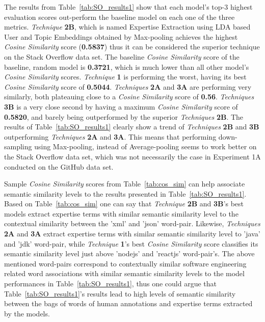         The results from Table~\ref{tab:SO_results1} show that each model's top-$3$ highest evaluation scores out-perform the baseline model on each one of the three metrics. \emph{Technique} \textbf{2B}, which is named Expertise Extraction using LDA based User and Topic Embeddings obtained by Max-pooling achieves the highest \emph{Cosine Similarity} score (\textbf{0.5837}) thus it can be considered the superior technique on the Stack Overflow data set. The baseline \emph{Cosine Similarity} score of the baseline, random model is \textbf{0.3721}, which is much lower than all other model's \emph{Cosine Similarity} scores. \emph{Technique} \textbf{1} is performing the worst, having its best \emph{Cosine Similarity} score of \textbf{0.5044}. \emph{Techniques} \textbf{2A} and \textbf{3A} are performing very similarly, both plateauing close to a \emph{Cosine Similarity} score of \textbf{0.56}. \emph{Techniques} \textbf{3B} is a very close second by having a maximum \emph{Cosine Similarity} score of \textbf{0.5820}, and barely being outperformed by the superior \emph{Techniques} \textbf{2B}. The results of Table~\ref{tab:SO_results1} clearly show a trend of \emph{Techniques} \textbf{2B} and \textbf{3B} outperforming \emph{Techniques} \textbf{2A} and \textbf{3A}. This means that performing down-sampling using Max-pooling, instead of Average-pooling seems to work better on the Stack Overflow data set, which was not necessarily the case in Experiment 1A conducted on the GitHub data set.
        
        Sample \emph{Cosine Similarity} scores from Table~\ref{tab:cos_sim} can help associate semantic similarity levels to the results presented in Table~\ref{tab:SO_results1}. Based on Table~\ref{tab:cos_sim} one can say that \emph{Technique} \textbf{2B} and \textbf{3B}'s best models extract expertise terms with similar semantic similarity level to the contextual similarity between the 'xml' and 'json' word-pair. Likewise, \emph{Techniques} \textbf{2A} and \textbf{3A} extract expertise terms with similar semantic similarity level to 'java' and 'jdk' word-pair, while \emph{Technique} \textbf{1}'s best \emph{Cosine Similarity} score classifies its semantic similarity level just above 'nodejs' and 'reactjs' word-pair's. The above mentioned word-pairs correspond to contextually similar software engineering related word associations with similar semantic similarity levels to the model performances in Table~\ref{tab:SO_results1}, thus one could argue that Table~\ref{tab:SO_results1}'s results lead to high levels of semantic similarity between the bags of words of human annotations and expertise terms extracted by the models.
        
